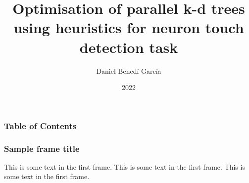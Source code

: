 \documentclass{beamer}
\title[Optimisation of k-d trees for brain simulation]{Optimisation of parallel k-d trees using heuristics for neuron touch detection task}
\author{Daniel Benedí García}
\institute[KTH]{ROYAL INSTITUTE OF TECHNOLOGY}
\date{2022}
\begin{document}
\frame{\titlepage}

\begin{frame}
    \frametitle{Table of Contents}
    \tableofcontents
\end{frame}

\begin{frame}
\frametitle{Sample frame title}
This is some text in the first frame. This is some text in the first frame. This is some text in the first frame.
\end{frame}
\end{document}
